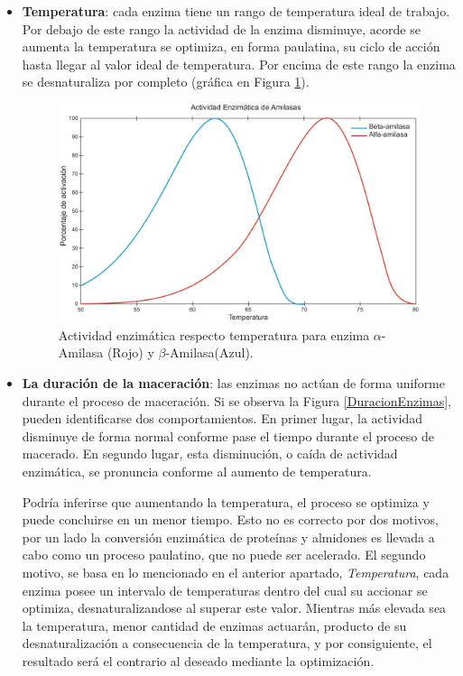                 \begin{itemize}
                
                    \item {\textbf{Temperatura}:} cada enzima tiene un rango de temperatura ideal de trabajo. Por debajo de este rango la actividad de la enzima disminuye, acorde se aumenta la temperatura se optimiza, en forma paulatina, su ciclo de acción hasta llegar al valor ideal de temperatura. Por encima de este rango la enzima se desnaturaliza por completo (gráfica en Figura \ref{TemperaturaEnzimas}).
                    \\ %
                    \begin{figure} [h]		                                                                \centerline{\includegraphics[scale=0.4]{temperatura_amilasas.jpg}}
		                \caption{Actividad enzimática respecto temperatura para enzima $\alpha$-Amilasa (Rojo) y $\beta$-Amilasa(Azul).}
	                    \label{TemperaturaEnzimas}
    	           \end{figure}
    	           
    	            \item {\textbf{La duración de la maceración}:} las enzimas no actúan de forma uniforme durante el proceso de maceración. Si se observa la Figura \ref{DuracionEnzimas}, pueden identificarse dos comportamientos. En primer lugar, la actividad disminuye de forma normal conforme pase el tiempo durante el proceso de macerado. En segundo lugar, esta disminución, o caída de actividad enzimática, se pronuncia conforme al aumento de temperatura.
    	            
    	            \par Podría inferirse que aumentando la temperatura, el proceso se optimiza y puede concluirse en un menor tiempo. Esto no es correcto por dos motivos, por un lado la conversión enzimática de proteínas y almidones es llevada a cabo como un proceso paulatino, que no puede ser acelerado. El segundo motivo, se basa en lo mencionado en el anterior apartado, \textit{Temperatura}, cada enzima posee un intervalo de temperaturas dentro del cual su accionar se optimiza, desnaturalizandose al superar este valor. Mientras más elevada sea la temperatura, menor cantidad de enzimas actuarán, producto de su desnaturalización a consecuencia de la temperatura, y por consiguiente, el resultado será el contrario al deseado mediante la optimización.
    	            

\end{itemize}

